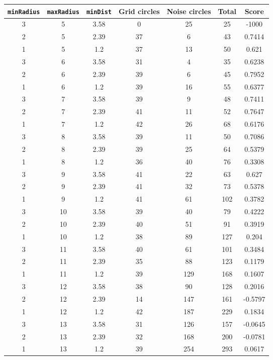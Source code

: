 \documentclass[letterpaper, 12pt]{article}
\begin{document}
\begin{longtable}{|c|c|c|c|c|c|c|}
\hline
\textbf{\texttt{minRadius}} & \textbf{\texttt{maxRadius}} & \textbf{\texttt{minDist}} & \textbf{Grid circles} & \textbf{Noise circles} & \textbf{Total} & \textbf{Score} \\
\hline
3 & 5 & 3.58 & 0 & 25 & 25 & -1000 \\
\hline
2 & 5 & 2.39 & 37 & 6 & 43 & 0.7414 \\
\hline
1 & 5 & 1.2 & 37 & 13 & 50 & 0.621 \\
\hline
3 & 6 & 3.58 & 31 & 4 & 35 & 0.6238 \\
\hline
2 & 6 & 2.39 & 39 & 6 & 45 & 0.7952 \\
\hline
1 & 6 & 1.2 & 39 & 16 & 55 & 0.6377 \\
\hline
3 & 7 & 3.58 & 39 & 9 & 48 & 0.7411 \\
\hline
2 & 7 & 2.39 & 41 & 11 & 52 & 0.7647 \\
\hline
1 & 7 & 1.2 & 42 & 26 & 68 & 0.6176 \\
\hline
3 & 8 & 3.58 & 39 & 11 & 50 & 0.7086 \\
\hline
2 & 8 & 2.39 & 39 & 25 & 64 & 0.5379 \\
\hline
1 & 8 & 1.2 & 36 & 40 & 76 & 0.3308 \\
\hline
3 & 9 & 3.58 & 41 & 22 & 63 & 0.627 \\
\hline
2 & 9 & 2.39 & 41 & 32 & 73 & 0.5378 \\
\hline
1 & 9 & 1.2 & 41 & 61 & 102 & 0.3782 \\
\hline
3 & 10 & 3.58 & 39 & 40 & 79 & 0.4222 \\
\hline
2 & 10 & 2.39 & 40 & 51 & 91 & 0.3919 \\
\hline
1 & 10 & 1.2 & 38 & 89 & 127 & 0.204 \\
\hline
3 & 11 & 3.58 & 40 & 61 & 101 & 0.3484 \\
\hline
2 & 11 & 2.39 & 35 & 88 & 123 & 0.1179 \\
\hline
1 & 11 & 1.2 & 39 & 129 & 168 & 0.1607 \\
\hline
3 & 12 & 3.58 & 38 & 90 & 128 & 0.2016 \\
\hline
2 & 12 & 2.39 & 14 & 147 & 161 & -0.5797 \\
\hline
1 & 12 & 1.2 & 42 & 187 & 229 & 0.1834 \\
\hline
3 & 13 & 3.58 & 31 & 126 & 157 & -0.0645 \\
\hline
2 & 13 & 2.39 & 32 & 168 & 200 & -0.0781 \\
\hline
1 & 13 & 1.2 & 39 & 254 & 293 & 0.0617 \\

\end{longtable}
\end{document}
